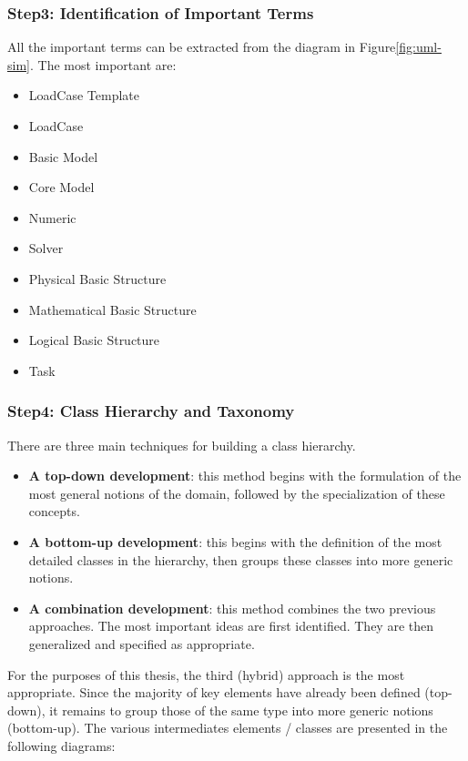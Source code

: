     \subsubsection{Step3: Identification of Important Terms}
    All the important terms can be extracted from the diagram in Figure\ref{fig:uml-sim}. The most important are:
    \begin{itemize}
        \item LoadCase Template
        \item LoadCase
        \item Basic Model
        \item Core Model
        \item Numeric 
        \item Solver
        \item Physical Basic Structure
        \item Mathematical Basic Structure
        \item Logical Basic Structure
        \item Task
    \end{itemize}

    
    \subsubsection{Step4: Class Hierarchy and Taxonomy}
    There are three main techniques for building a class hierarchy.
    \begin{itemize}
        \item \textbf{A top-down development}: this method begins with the formulation of the most general notions of the domain, followed by the specialization of these concepts.
        \item \textbf{A bottom-up development}: this begins with the definition of the most detailed classes in the hierarchy, then groups these classes into more generic notions.
        \item \textbf{A combination development}: this method combines the two previous approaches. The most important ideas are first identified. They are then generalized and specified as appropriate.
    \end{itemize}
    
    For the purposes of this thesis, the third (hybrid) approach is the most appropriate. Since the majority of key elements have already been defined (top-down), it remains to group those of the same type into more generic notions (bottom-up). The various intermediates elements / classes are presented in the following diagrams:
    
